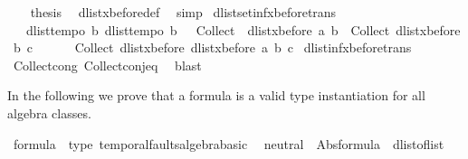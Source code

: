 \begin{isabellebody}
\ \ \isamarkupfalse%
\ {\isacharquery}thesis\ \isamarkupfalse%
\ dlist{\isacharunderscore}xbefore{\isacharunderscore}def\ \isamarkupfalse%
\ simp\isanewline
{}\isamarkupfalse%
%
\endisatagproof
{\isafoldproof}%
%
\isadelimproof
\isanewline
%
\endisadelimproof
\isanewline
{}\isamarkupfalse%
\ dlistset{\isacharunderscore}inf{\isacharunderscore}xbefore{\isacharunderscore}trans{\isacharcolon}\isanewline
\ \ {\isachardoublequoteopen}{\isasymlbrakk}\ dlist{\isacharunderscore}tempo{}\ b{\isacharsemicolon}\ dlist{\isacharunderscore}tempo{}\ b\ {\isasymrbrakk}\ {\isasymLongrightarrow}\ {\isacharparenleft}Collect\ \ {\isacharparenleft}dlist{\isacharunderscore}xbefore\ a\ b{\isacharparenright}\ {\isasyminter}\ Collect\ {\isacharparenleft}dlist{\isacharunderscore}xbefore\ b\ c{\isacharparenright}{\isacharparenright}\ {\isacharequal}\ \isanewline
\ \ \ \ Collect\ {\isacharparenleft}dlist{\isacharunderscore}xbefore\ {\isacharparenleft}dlist{\isacharunderscore}xbefore\ a\ b{\isacharparenright}\ c{\isacharparenright}{\isachardoublequoteclose}\isanewline
%
\isadelimproof
%
\endisadelimproof
%
\isatagproof
{}\isamarkupfalse%
\ dlist{\isacharunderscore}inf{\isacharunderscore}xbefore{\isacharunderscore}trans\isanewline
{}\isamarkupfalse%
\ Collect{\isacharunderscore}cong\ Collect{\isacharunderscore}conj{\isacharunderscore}eq\ \isamarkupfalse%
\ blast%
\endisatagproof
{\isafoldproof}%
%
\isadelimproof
%
\endisadelimproof
%
\isamarkuptrue%
%
\begin{isamarkuptext}%
In the following we prove that a formula is a valid type instantiation for all \ac{algebra} classes.%
\end{isamarkuptext}\isamarkuptrue%
%
\isamarkuptrue%
\isamarkupfalse%
\ formula\ {\isacharcolon}{\isacharcolon}\ {\isacharparenleft}type{\isacharparenright}\ temporal{\isacharunderscore}faults{\isacharunderscore}algebra{\isacharunderscore}basic\isanewline
{}\isanewline
\isanewline
{}\isamarkupfalse%
\isanewline
\ \ {\isachardoublequoteopen}neutral\ {\isacharequal}\ Abs{\isacharunderscore}formula\ {\isacharbraceleft}\ dlist{\isacharunderscore}of{\isacharunderscore}list\ {\isacharbrackleft}{\isacharbrackright}\ {\isacharbraceright}{\isachardoublequoteclose}\isanewline
\isanewline
{}\isamarkupfalse%

\end{isabellebody}
